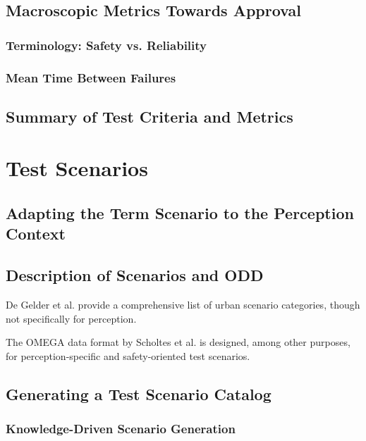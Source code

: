 \documentclass[conference]{IEEEtran}
\begin{document}
\subsection{Macroscopic Metrics Towards Approval} 
\label{sec:safety_metrics_macro}

\subsubsection{Terminology: Safety vs. Reliability}

\subsubsection{Mean Time Between Failures}

\subsection{Summary of Test Criteria and Metrics}

\section{Test Scenarios}
\label{sec:axis_test_scenarios}
\subsection{Adapting the Term Scenario to the Perception Context}
\label{sec:what_are_perc_scenarios}

\subsection{Description of Scenarios and ODD}
\label{sec:describing_scenarios_odd}

De Gelder et al. \cite{DeGelder2020categories} provide a comprehensive list of urban scenario categories, though not specifically for perception. 

The OMEGA data format by Scholtes et al. \cite{Scholtes2022omega} is designed, among other purposes, for perception-specific and safety-oriented test scenarios.

\subsection{Generating a Test Scenario Catalog}
\label{sec:scenarios_obtaining}


\subsubsection{Knowledge-Driven Scenario Generation} 
\label{sec:scenario_gen_knowledge_driven}
\end{document}
